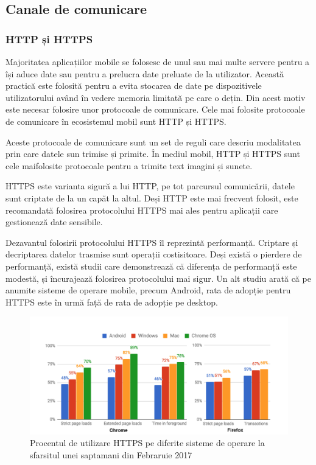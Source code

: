 \documentclass[12pt]{article}
\begin{document}
\subsection{Canale de comunicare}
\subsubsection{HTTP și HTTPS}

Majoritatea aplicațiilor mobile se folosesc de unul sau mai multe servere pentru a își aduce date
sau pentru a prelucra date preluate de la utilizator. Această practică este folosită pentru a evita  stocarea de
date pe dispozitivele utilizatorului având în vedere memoria limitată pe care o dețin. Din acest motiv 
este necesar folosire unor protocoale de comunicare. Cele mai folosite protocoale de comunicare în ecosistemul
mobil sunt HTTP și HTTPS.

Aceste protocoale de comunicare sunt un set de reguli care descriu modalitatea prin care datele sun trimise și 
primite. În mediul mobil, HTTP și HTTPS sunt cele maifolosite protocoale pentru a trimite text imagini și sunete.

HTTPS este varianta sigură a lui HTTP, pe tot parcursul comunicării, datele sunt criptate de la un capăt la altul.
Deși HTTP este mai frecvent folosit, este recomandată folosirea protocolului HTTPS mai ales pentru aplicații 
care gestionează date sensibile.

Dezavantul folosirii protocolului HTTPS îl reprezintă performanță. Criptare și decriptarea datelor trasmise sunt
operații costisitoare. Deși există o pierdere de performanță, există studii \cite{goldberg1998comparison} care demonstrează
că diferența de performanță este modestă, și încurajează folosirea protocolului mai sigur. Un alt studiu \cite{felt2017measuring}
arată că pe anumite sisteme de operare mobile, precum Android, rata de adopție pentru HTTPS este în urmă față de rata de adopție
pe desktop. 

\begin{figure}[H]
\centering
\includegraphics{http.png}
\caption{Procentul de utilizare HTTPS pe diferite sisteme de operare la sfarsitul unei saptamani din
Febraruie 2017 \cite{felt2017measuring}}
\end{figure}
\end{document}
